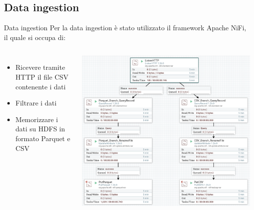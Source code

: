 \documentclass[13pt,aspectratio=169,t,xcolor=table]{beamer}
\begin{document}
\subsection{Data ingestion}
\begin{frame}{Data ingestion}
    Per la data ingestion è stato utilizzato il framework Apache NiFi, il quale si occupa di:
    \begin{columns}
            \begin{minipage}[b]{1\textwidth}
                \begin{itemize}
                    \item Ricevere tramite HTTP il file CSV contenente i dati
                    \item Filtrare i dati
                    \item Memorizzare i dati su HDFS in formato Parquet e CSV
                \end{itemize}
            \end{minipage}
            \begin{minipage}{1\textwidth}
                \begin{adjustbox}{margin=0cm 0cm 1.7cm 0cm, center} %
                    \includegraphics[width=1\textwidth]{res/nifi_flow.png}
                \end{adjustbox}
            \end{minipage}
    \end{columns}
\end{frame}
\end{document}
